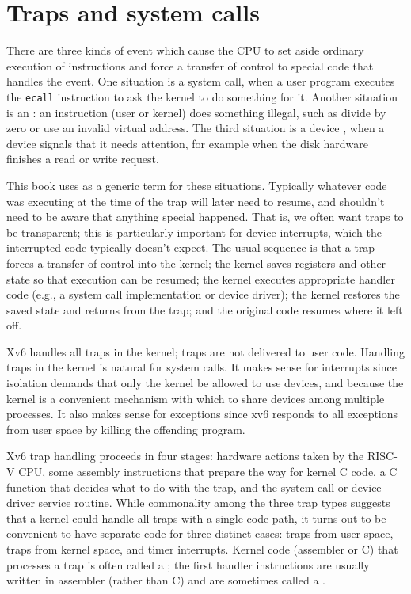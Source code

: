 \chapter{Traps and system calls}
\label{CH:TRAP}

There are three kinds of event which cause the CPU to set
aside ordinary execution of instructions and force a
transfer of control to special code that handles the event. One
situation is a system call, when a user program 
executes the {\tt ecall} instruction to ask the kernel to do 
something for it. Another situation is an :
an instruction (user or kernel) does something illegal, such as divide
by zero or use an invalid virtual address. The third situation is a
device , when a device signals that it needs
attention, for example when the disk hardware finishes a read or write
request.

This book uses  as a generic term for these
situations. Typically whatever code was executing at the time of the
trap will later need to resume, and shouldn't need to be aware that
anything special happened. That is, we often want traps to be
transparent; this is particularly important for device interrupts, which the
interrupted code typically doesn't expect. The usual sequence is that
a trap forces a transfer of control into the kernel; the kernel saves
registers and other state so that execution can be resumed; the kernel
executes appropriate handler code (e.g., a system call implementation
or device driver); the kernel restores the saved state and returns
from the trap; and the original code resumes where it left off.

Xv6 handles all traps in the kernel; traps are not delivered to user
code. Handling traps in the kernel is natural for system calls. It
makes sense for interrupts since isolation demands that only the
kernel be allowed to use devices,
and because the kernel is a convenient mechanism with which to
share devices among multiple processes.
It also makes sense for exceptions
since xv6 responds to all exceptions from user space by killing the
offending program.

Xv6 trap handling proceeds in four stages: hardware actions taken by
the RISC-V CPU, some assembly instructions that prepare the way for
kernel C code, a C function that decides what to do with the trap,
and the system call or device-driver service routine. While
commonality among the three trap types suggests that a kernel could
handle all traps with a single code path, it turns out to be
convenient to have separate code for
three distinct cases: traps from user space, traps from kernel space,
and timer interrupts. Kernel code (assembler or C) that
processes a trap is often called a ;
the first handler instructions are usually written in assembler
(rather than C) and are sometimes called a .


